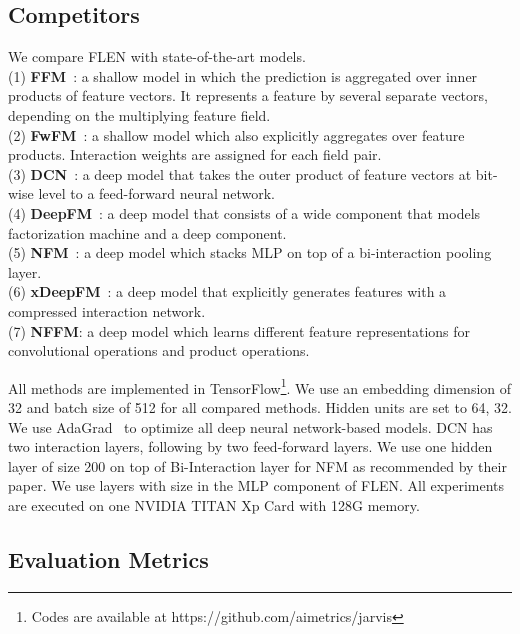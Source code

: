 \documentclass[sigconf]{acmart}
\begin{document}
\subsection{Competitors}

We compare FLEN with  state-of-the-art models. \\
(1) \textbf{FFM}~\citep{juan2017field}: a shallow model in which the prediction is aggregated over inner products of feature vectors. It represents a feature by several separate vectors, depending on the multiplying feature field. \\
(2) \textbf{FwFM}~\citep{pan2018field}: a shallow model which also explicitly aggregates over feature products. Interaction weights are assigned for each field pair. \\
(3) \textbf{DCN}~\citep{wang2017deep}: a deep model that takes the outer product of feature vectors at bit-wise level to a feed-forward neural network. \\
(4) \textbf{DeepFM}~\citep{guo2017deepfm}: a deep model that consists of a wide component that models factorization machine and a deep component. \\
(5) \textbf{NFM}~\citep{he2017neural}: a deep model which stacks MLP on top of a bi-interaction pooling layer. \\
(6) \textbf{xDeepFM}~\citep{lian2018xdeepfm}: a deep model that explicitly generates features with a compressed interaction network. \\
(7) \textbf{NFFM}\citep{Yang2019Operation}: a deep model which learns different feature representations for convolutional operations and product operations.

All methods are implemented in TensorFlow\footnote{Codes are available at https://github.com/aimetrics/jarvis}.
We use an embedding dimension of 32 and batch size of 512 for all compared methods. Hidden units  are set to 64, 32. We use AdaGrad~\citep{duchi2011adaptive} to optimize all deep neural network-based models. DCN has two interaction layers, following by two feed-forward layers. We use one hidden layer of size 200 on top of Bi-Interaction layer for NFM as recommended by their paper. 
We use  layers with size  in the MLP component of FLEN. 
All experiments are executed on one NVIDIA TITAN Xp Card with 128G memory.

\subsection{Evaluation Metrics}
\end{document}
